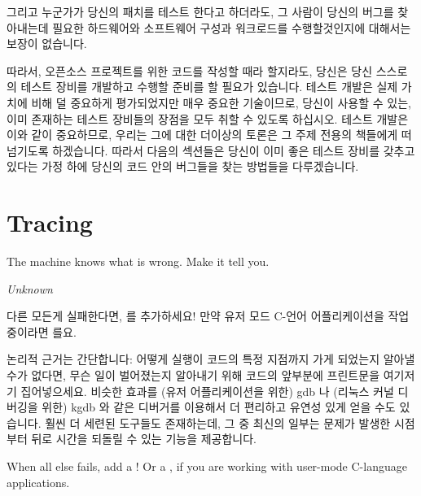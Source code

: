 그리고 누군가가 당신의 패치를 테스트 한다고 하더라도, 그 사람이 당신의 버그를
찾아내는데 필요한 하드웨어와 소프트웨어 구성과 워크로드를 수행할것인지에
대해서는 보장이 없습니다.

따라서, 오픈소스 프로젝트를 위한 코드를 작성할 때라 할지라도, 당신은 당신
스스로의 테스트 장비를 개발하고 수행할 준비를 할 필요가 있습니다.
테스트 개발은 실제 가치에 비해 덜 중요하게 평가되었지만 매우 중요한 기술이므로,
당신이 사용할 수 있는, 이미 존재하는 테스트 장비들의 장점을 모두 취할 수 있도록
하십시오.
테스트 개발은 이와 같이 중요하므로, 우리는 그에 대한 더이상의 토론은 그 주제
전용의 책들에게 떠넘기도록 하겠습니다.
따라서 다음의 섹션들은 당신이 이미 좋은 테스트 장비를 갖추고 있다는 가정 하에
당신의 코드 안의 버그들을 찾는 방법들을 다루겠습니다.

\section{Tracing}
\label{sec:debugging:Tracing}
%
\epigraph{The machine knows what is wrong.  Make it tell you.}{\emph{Unknown}}

다른 모든게 실패한다면,  를 추가하세요!
만약 유저 모드 C-언어 어플리케이션을 작업 중이라면  를요.

논리적 근거는 간단합니다: 어떻게 실행이 코드의 특정 지점까지 가게 되었는지
알아낼 수가 없다면, 무슨 일이 벌어졌는지 알아내기 위해 코드의 앞부분에
프린트문을 여기저기 집어넣으세요.
비슷한 효과를 (유저 어플리케이션을 위한) gdb 나 (리눅스 커널 디버깅을 위한)
kgdb 와 같은 디버거를 이용해서 더 편리하고 유연성 있게 얻을 수도 있습니다.
훨씬 더 세련된 도구들도 존재하는데, 그 중 최신의 일부는 문제가 발생한 시점부터
뒤로 시간을 되돌릴 수 있는 기능을 제공합니다.
\iffalse

When all else fails, add a !
Or a , if you are working with user-mode C-language applications.

